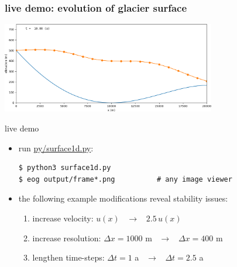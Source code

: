 \documentclass[10pt,dvipsnames]{beamer}
\begin{document}
\begin{frame}[fragile]
\frametitle{live demo: evolution of glacier surface}
\begin{center}
\includegraphics[width=0.7\textwidth]{frame010}
\end{center}

\bigskip
\begin{block}{live demo}
\begin{itemize}
\item run \href{https://github.com/bueler/mccarthy/blob/master/py/surface1d.py}{py/surface1d.py}:
\begin{verbatim}
$ python3 surface1d.py
$ eog output/frame*.png          # any image viewer
\end{verbatim}
\item the following example modifications reveal stability issues:
    \begin{enumerate}
    \item increase velocity: \quad $u(x)$ \, $\to$ \, $2.5\, u(x)$
    \item increase resolution: \quad $\Delta x=1000$ m \, $\to$ \, $\Delta x=400$ m
    \item lengthen time-steps: \quad $\Delta t = 1$ a \, $\to$ \, $\Delta t = 2.5$ a
    \end{enumerate}
\end{itemize}
\end{block}
\end{frame}
\end{document}
